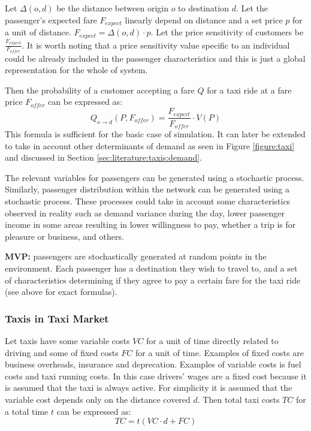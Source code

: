 Let \(\Delta(o,d)\) be the distance between origin \(o\) to destination \(d\). 
\newline
Let the passenger's expected fare \(F_{expect}\) linearly depend on distance
and a set price \(p\) for a unit of distance. \(F_{expect} = \Delta(o,d) \cdot
p \). \newline
Let the price sensitivity of customers be \(\frac{F_{expect}}{F_{offer}}\). It
is worth noting that a price sensitivity value specific to an individual could
be already included in the passenger characteristics and this is just a global
representation for the whole of system. \newline

Then the probability of a customer accepting a fare \(Q\) for a taxi ride at a
fare price \(F_{offer}\) can be expressed as: 
\begin{equation} 
  \label{eq:requirements:demand}
  Q_{o \rightarrow d} (P,F_{offer}) = \frac{F_{expect}}{F_{offer}} \cdot V(P)
\end{equation}
This formula is sufficient for the basic case of simulation. It can later be
extended to take in account other determinants of demand as seen in Figure
\ref{figure:taxi} and discussed in Section \ref{sec:literature:taxis:demand}.

The relevant variables for passengers can be generated using a stochastic
process. Similarly, passenger distribution within the network can be generated
using a stochastic process. These processes could take in account some
characteristics observed in reality such as demand variance during the day,
lower passenger income in some areas resulting in lower willingness to pay,
whether a trip is for pleasure or business, and others.

\textbf{MVP:} passengers are stochastically generated at random points in the
environment. Each passenger has a destination they wish to travel to, and a
set of characteristics determining if they agree to pay a certain fare for the
taxi ride (see above for exact formulas).


\subsubsection{Taxis in Taxi Market}
\label{sec:requirements:taxi}

Let taxis have some variable costs \(VC\) for a unit of time directly related
to driving and some of fixed costs \(FC\) for a unit of time. Examples of fixed
costs are business overheads, insurance and deprecation. Examples of variable
costs is fuel costs and taxi running costs. In this case drivers' wages are a
fixed cost because it is assumed that the taxi is always active. For simplicity
it is assumed that the variable cost depends only on the distance covered
\(d\). Then total taxi costs \(TC\) for a total time \(t\) can be expressed as:
\[ TC = t(VC\cdot d + FC) \]

